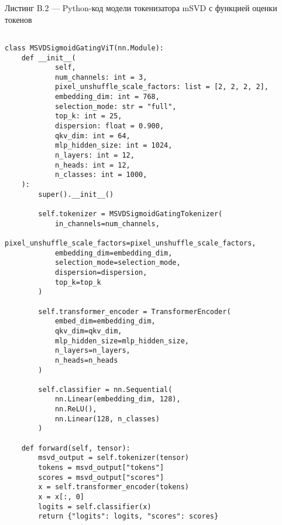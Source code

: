 \noindent Листинг B.2 — Python-код модели токенизатора mSVD с функцией оценки токенов
{\scriptsize
\begin{verbatim}

class MSVDSigmoidGatingViT(nn.Module):
    def __init__(
            self,
            num_channels: int = 3,
            pixel_unshuffle_scale_factors: list = [2, 2, 2, 2],
            embedding_dim: int = 768,
            selection_mode: str = "full",
            top_k: int = 25,
            dispersion: float = 0.900,
            qkv_dim: int = 64,
            mlp_hidden_size: int = 1024,
            n_layers: int = 12,
            n_heads: int = 12,
            n_classes: int = 1000,
    ):
        super().__init__()

        self.tokenizer = MSVDSigmoidGatingTokenizer(
            in_channels=num_channels,
            pixel_unshuffle_scale_factors=pixel_unshuffle_scale_factors,
            embedding_dim=embedding_dim,
            selection_mode=selection_mode,
            dispersion=dispersion,
            top_k=top_k
        )

        self.transformer_encoder = TransformerEncoder(
            embed_dim=embedding_dim,
            qkv_dim=qkv_dim,
            mlp_hidden_size=mlp_hidden_size,
            n_layers=n_layers,
            n_heads=n_heads
        )

        self.classifier = nn.Sequential(
            nn.Linear(embedding_dim, 128),
            nn.ReLU(),
            nn.Linear(128, n_classes)
        )

    def forward(self, tensor):
        msvd_output = self.tokenizer(tensor)
        tokens = msvd_output["tokens"]
        scores = msvd_output["scores"]
        x = self.transformer_encoder(tokens)
        x = x[:, 0]
        logits = self.classifier(x)
        return {"logits": logits, "scores": scores}


\end{verbatim}
}